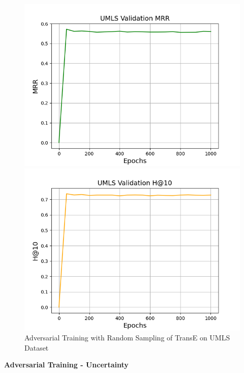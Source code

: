 \begin{figure}
    \begin{minipage}{.5\textwidth}
      \centering
      \includegraphics[width=0.9\linewidth]{figures/results/UMLS/AdversarialTraining/Random/gan_train_umls_mrr.png}
    \end{minipage}%
    \begin{minipage}{.5\textwidth}
      \centering
      \includegraphics[width=0.9\linewidth]{figures/results/UMLS/AdversarialTraining/Random/gan_train_umls_hit10.png}
    \end{minipage}%
    \caption{Adversarial Training with Random Sampling of TransE on UMLS Dataset}
    \label{fig:test}
\end{figure}

\textbf{Adversarial Training - Uncertainty}\\